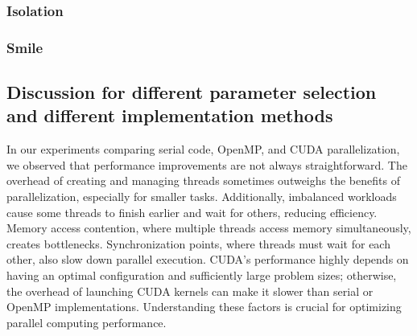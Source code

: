 \subsubsection{Isolation}


\subsubsection{Smile}


\subsection{Discussion for different parameter selection and different implementation methods}

In our experiments comparing serial code, OpenMP, and CUDA parallelization, we observed that performance improvements are not always straightforward. The overhead of creating and managing threads sometimes outweighs the benefits of parallelization, especially for smaller tasks. Additionally, imbalanced workloads cause some threads to finish earlier and wait for others, reducing efficiency. Memory access contention, where multiple threads access memory simultaneously, creates bottlenecks. Synchronization points, where threads must wait for each other, also slow down parallel execution. CUDA's performance highly depends on having an optimal configuration and sufficiently large problem sizes; otherwise, the overhead of launching CUDA kernels can make it slower than serial or OpenMP implementations. Understanding these factors is crucial for optimizing parallel computing performance.